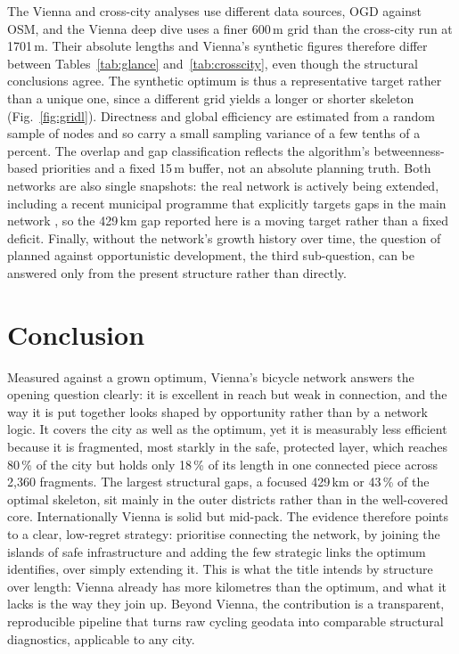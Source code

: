 \documentclass[11pt,a4paper]{article}
\begin{document}
The Vienna and cross-city analyses use different data sources, OGD against OSM, and the
Vienna deep dive uses a finer 600\,m grid than the cross-city run at 1701\,m. Their absolute
lengths and Vienna's synthetic figures therefore differ between Tables~\ref{tab:glance}
and~\ref{tab:crosscity}, even though the structural conclusions agree. The synthetic optimum
is thus a representative target rather than a unique one, since a different grid yields a
longer or shorter skeleton (Fig.~\ref{fig:gridl}). Directness and global efficiency are estimated from a random
sample of nodes and so carry a small sampling variance of a few tenths of a percent. The
overlap and gap classification reflects the algorithm's betweenness-based priorities and a
fixed 15\,m buffer, not an absolute planning truth. Both networks are also single snapshots:
the real network is actively being extended, including a recent municipal programme that
explicitly targets gaps in the main network \citep{wienradprogramm}, so the 429\,km gap
reported here is a moving target rather than a fixed deficit. Finally, without the network's
growth history over time, the question of planned against opportunistic development, the
third sub-question, can be answered only from the present structure rather than directly.

\section{Conclusion}

Measured against a grown optimum, Vienna's bicycle network answers the opening question
clearly: it is excellent in reach but weak in connection, and the way it is put together
looks shaped by opportunity rather than by a network logic. It covers the city as well as
the optimum, yet it is measurably less efficient because it is fragmented, most starkly in
the safe, protected layer, which reaches 80\,\% of the city but holds only 18\,\% of its
length in one connected piece across 2{,}360 fragments. The largest structural gaps, a
focused 429\,km or 43\,\% of the optimal skeleton, sit mainly in the outer districts rather
than in the well-covered core. Internationally Vienna is solid but mid-pack. The evidence
therefore points to a clear, low-regret strategy: prioritise connecting the network, by
joining the islands of safe infrastructure and adding the few strategic links the optimum
identifies, over simply extending it. This is what the title intends by structure over
length: Vienna already has more kilometres than the optimum, and what it lacks is the way
they join up. Beyond Vienna, the contribution is a transparent, reproducible pipeline that
turns raw cycling geodata into comparable structural diagnostics, applicable to any city.


\renewcommand{\refname}{References}

\nocite{*}
\end{document}
